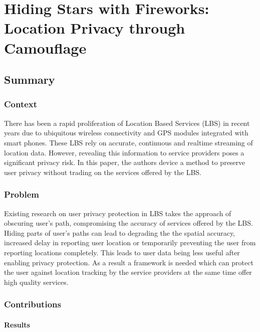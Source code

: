 \newpage
\section{Hiding Stars with Fireworks:
Location Privacy through Camouflage \cite{conf/europar/PetzoldBTU06}} \label{lect4}

\subsection{Summary} \label{lect4-sum}

\subsubsection{Context}

There has been a rapid proliferation of Location Based Services (LBS) in recent
years due to ubiquitous wireless connectivity and GPS modules integrated with 
smart phones. These LBS rely on accurate, continuous and realtime streaming of 
location data. However, revealing this information to service providers poses a 
significant privacy risk. In this paper, the authors device a method to preserve
user privacy without trading on the services offered by the LBS. 

\subsubsection{Problem}

Existing research on user privacy protection in LBS takes the approach of 
obscuring user's path, compromising the accuracy of services offered by the 
LBS. Hiding parts of user's paths can lead to degrading the the spatial accuracy, 
increased delay in reporting user location or temporarily preventing the user from
reporting locations completely. This leads to user data being less useful after
enabling privacy protection. As a result a framework is needed which can protect
the user against location tracking by the service providers at the same time
offer high quality services. 
  
\subsubsection{Contributions}




\paragraph{Results}



